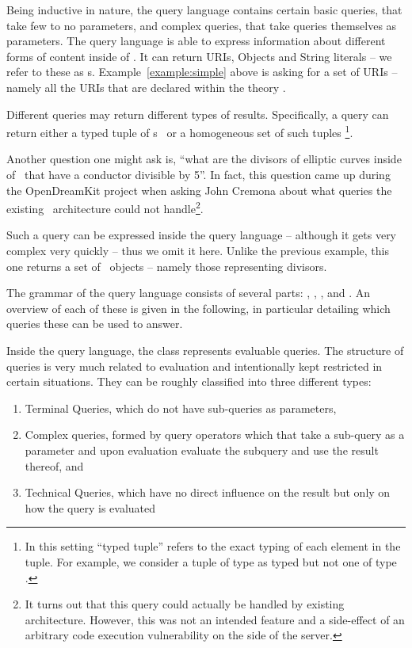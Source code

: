 Being inductive in nature, the query language contains certain basic queries, that take few to no parameters, and complex queries, that take queries themselves as parameters. 
The query language is able to express information about different forms of content inside of \mmt. 
It can return URIs, Objects and String literals -- we refer to these as s.
Example~\ref{example:simple} above is asking for a set of URIs -- namely all the URIs that are declared within the theory .

Different queries may return different types of results.
Specifically, a query can return either a typed tuple of s  or a homogeneous set of such tuples
\footnote{In this setting ``typed tuple'' refers to the exact typing of each element in the tuple.
For example, we consider a tuple of type  as typed but not one of type . }.

\begin{example}\label{example:divisible}
	Another question one might ask is, ``what are the divisors of elliptic curves inside of \lmfdb\ that have a conductor divisible by 5''.
	In fact, this question came up during the OpenDreamKit project when asking John Cremona about what queries the existing \lmfdb\ architecture could not handle\footnote{
		It turns out that this query could actually be handled by existing architecture.
		However, this was not an intended feature and a side-effect of an arbitrary code execution vulnerability on the side of the server.
	}.
\end{example}

Such a query can be expressed inside the query language -- although it gets very complex very quickly -- thus we omit it here. 
Unlike the previous example, this one returns a set of \mmt\ objects -- namely those representing divisors.

The grammar of the query language consists of several parts: , , ,  and .
An overview of each of these is given in the following, in particular detailing which queries these can be used to answer.

Inside the query language, the  class represents evaluable queries.
The structure of queries is very much related to evaluation and intentionally kept restricted in certain situations.
They can be roughly classified into three different types:
\begin{enumerate}
	\item Terminal Queries, which do not have sub-queries as parameters, 
	\item Complex queries, formed by query operators which that take a sub-query as a parameter and upon evaluation evaluate the subquery and use the result thereof, and
	\item Technical Queries, which have no direct influence on the result but only on how the query is evaluated
\end{enumerate}

